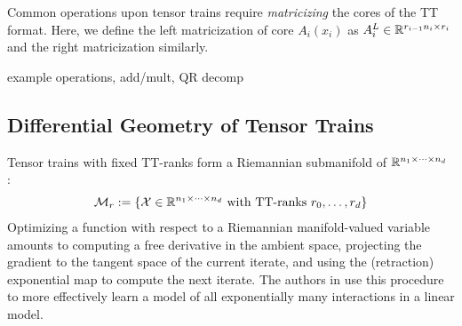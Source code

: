 Common operations upon tensor trains require \textit{matricizing} the cores of the TT format. Here, we define the left matricization of core $A_i(x_i)$ as $A_i^L \in \mathbb{R}^{r_{i-1}n_i \times r_i} $ and the right matricization similarly.

{\color{red} example operations, add/mult, QR decomp}

\subsection{Differential Geometry of Tensor Trains}
Tensor trains with fixed TT-ranks form a Riemannian submanifold of $\mathbb{R}^{n_1 \times \cdots \times n_d}$ \cite{lubich2015time, holtz2012manifolds}:
\begin{align}\label{eq:riem}
	\mathcal{M}_r := \{ \mathcal{X} \in \mathbb{R}^{n_1 \times \cdots \times n_d} \text{ with TT-ranks } r_0,\ldots,r_d\} 
\end{align}
Optimizing a function with respect to a Riemannian manifold-valued variable amounts to computing a free derivative in the ambient space, projecting the gradient to the tangent space of the current iterate, and using the (retraction) exponential map to compute the next iterate.
The authors in \cite{novikov2016exponential} use this procedure to more effectively learn a model of all exponentially many interactions in a linear model.

